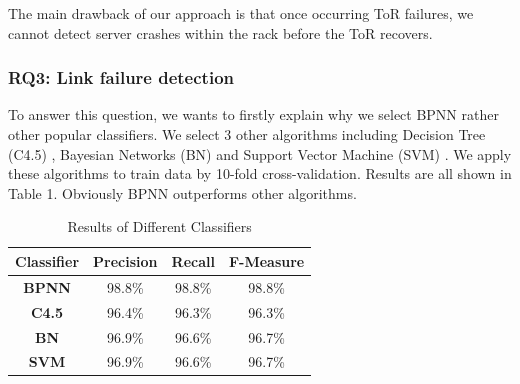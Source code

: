 \documentclass{sig-alternate-05-2015}
\begin{document}
The main drawback of our approach is that once occurring ToR failures, we cannot detect server crashes within the rack before the ToR recovers.


\subsubsection*{RQ3: Link failure detection}
\quad To answer this question, we wants to firstly explain why we select BPNN rather other popular classifiers. We select 3 other algorithms including Decision Tree (C4.5) \cite{quinlan2014c4}, Bayesian Networks (BN) \cite{jensen1996introduction} and Support Vector Machine (SVM) \cite{scholkopf1999advances}. We apply these algorithms to train data by 10-fold cross-validation. Results are all shown in Table 1. Obviously BPNN outperforms other algorithms.

\begin{table}
    \centering
    \caption{Results of Different Classifiers}
    \begin{tabular}{|c|c|c|c|} \hline
        \textbf{Classifier} & \textbf{Precision} & \textbf{Recall} & \textbf{F-Measure} \\ \hline
        \hline
        \textbf{BPNN} & 98.8\% & 98.8\% & 98.8\% \\ \hline
        \textbf{C4.5} & 96.4\% & 96.3\% & 96.3\% \\ \hline
        \textbf{BN} & 96.9\% & 96.6\% & 96.7\% \\ \hline
        \textbf{SVM} & 96.9\% & 96.6\% & 96.7\% \\ \hline
    \end{tabular}
\end{table}
\end{document}
